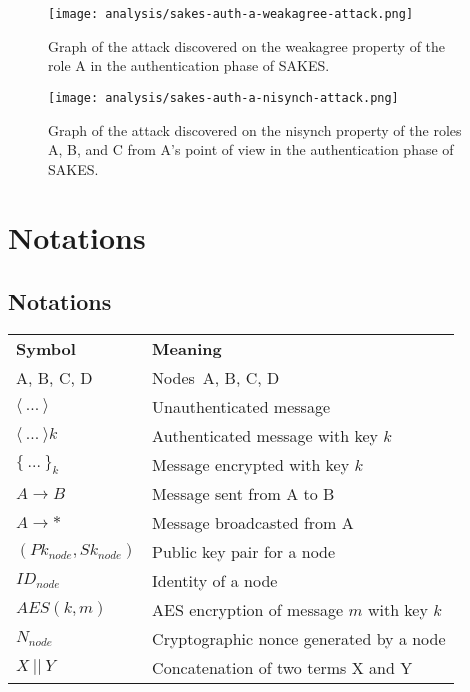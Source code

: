 \begin{figure}[h]
	\centering
	\texttt{[image: analysis/sakes-auth-a-weakagree-attack.png]}
	\caption{Graph of the attack discovered on the weakagree property of the role A in the authentication phase of SAKES.}
	\label{fig:sakes-attack-weakagree}
\end{figure}

\begin{figure}[h]
	\centering
	\texttt{[image: analysis/sakes-auth-a-nisynch-attack.png]}
	\caption{Graph of the attack discovered on the nisynch property of the roles A, B, and C from A's point of view in the authentication phase of SAKES.}
	\label{fig:sakes-attack-nisynch}
\end{figure}

\chapter{Notations}

\section{Notations}
\label{app:notations}

\begin{tcolorbox}[title=Notations used in protocol specifications]
\begin{tabular}{ll}
\multicolumn{1}{p{1.3cm}}{\textbf{Symbol}} & \multicolumn{1}{p{4cm}}{\textbf{Meaning}}\\
A, B, C, D & Nodes\ A, B, C, D\\
$\langle{\ ...\ }\rangle{}$ & Unauthenticated message\\
$\langle{\ ...\ }\rangle{k}$ & Authenticated message with key $k$\\
$\{\ ...\ \}_k$ & Message encrypted with key $k$\\
$A \rightarrow B$ & Message sent from A to B\\
$A \rightarrow *$ & Message broadcasted from A\\
$(Pk_{node}, Sk_{node})$ & Public key pair for a node \\
$ID_{node}$ & Identity of a node\\
$AES(k, m)$ & AES encryption of message $m$ with key $k$\\
$N_{node}$ & Cryptographic nonce generated by a node\\
$X\ ||\ Y$ & Concatenation of two terms X and Y\\ 
\end{tabular}
\end{tcolorbox}



